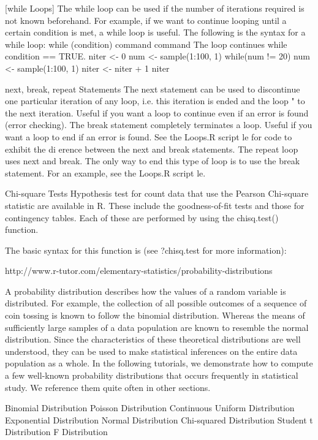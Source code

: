 \documentclass[a4paper,12pt]{article}
\begin{document}
[while Loops]
The while loop can be used if the number of iterations required is
not known beforehand. For example, if we want to continue
looping until a certain condition is met, a while loop is useful.
The following is the syntax for a while loop:
while (condition){
command
command
}
The loop continues while condition == TRUE.
niter <- 0
num <- sample(1:100, 1)
while(num != 20) {
num <- sample(1:100, 1)
niter <- niter + 1
}
niter

next, break, repeat Statements
The next statement can be used to discontinue one particular
iteration of any loop, i.e. this iteration is ended and the loop
\skips" to the next iteration. Useful if you want a loop to continue
even if an error is found (error checking).
The break statement completely terminates a loop. Useful if you
want a loop to end if an error is found. See the Loops.R script le
for code to exhibit the di erence between the next and break
statements.
The repeat loop uses next and break. The only way to end this
type of loop is to use the break statement. For an example, see
the Loops.R script le.

 

Chi-square Tests
Hypothesis test for count data that use the Pearson Chi-square statistic are available in R.
These include the goodness-of-fit tests and those for contingency tables. Each of these are
performed by using the chisq.test() function. 

The basic syntax for this function is (see ?chisq.test for more information): 
 
http://www.r-tutor.com/elementary-statistics/probability-distributions

A probability distribution describes how the values of a random variable is distributed. For example, the collection of all possible outcomes of a sequence of coin tossing is known to follow the binomial distribution. Whereas the means of sufficiently large samples of a data population are known to resemble the normal distribution. Since the characteristics of these theoretical distributions are well understood, they can be used to make statistical inferences on the entire data population as a whole.
In the following tutorials, we demonstrate how to compute a few well-known probability distributions that occurs frequently in statistical study. We reference them quite often in other sections.

Binomial Distribution
Poisson Distribution
Continuous Uniform Distribution
Exponential Distribution
Normal Distribution
Chi-squared Distribution
Student t Distribution
F Distribution
\end{document}
